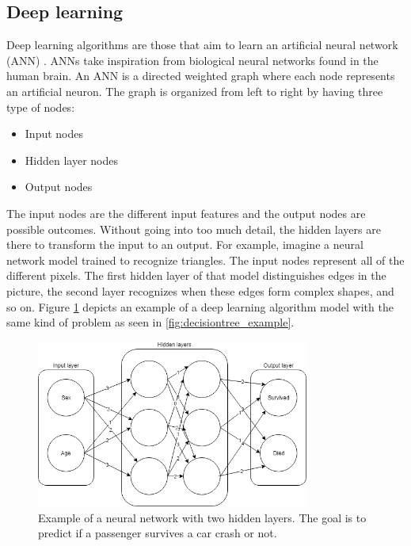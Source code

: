 	\subsection{Deep learning} \label{sec:deep_learning}
			Deep learning algorithms are those that aim to learn an artificial neural network (ANN) \cite{BOOK:6}. ANNs take inspiration from biological neural networks found in the human brain. An ANN is a directed weighted graph where each node represents an artificial neuron. The graph is organized from left to right by having three type of nodes:
	\begin{itemize}
		\item Input nodes
		\item Hidden layer nodes
		\item Output nodes
	\end{itemize}
			The input nodes are the different input features and the output nodes are possible outcomes. Without going into too much detail, the hidden layers are there to transform the input to an output. For example, imagine a neural network model trained to recognize triangles. The input nodes represent all of the different pixels. The first hidden layer of that model distinguishes edges in the picture, the second layer recognizes when these edges form complex shapes, and so on. Figure \ref{fig:neuralnetwork_example} depicts an example of a deep learning algorithm model with the same kind of problem as seen in \ref{fig:decisiontree_example}.

\begin{figure}[H] 
	\centering
	\includegraphics[width=0.8\textwidth]{media/neuralnetwork_ex.png}
	\caption{Example of a neural network with two hidden layers. The goal is to predict if a passenger survives a car crash or not.}
	\label{fig:neuralnetwork_example}
\end{figure}

